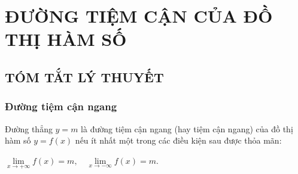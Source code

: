 \section[TIỆM CẬN]{ĐƯỜNG TIỆM CẬN CỦA ĐỒ THỊ HÀM SỐ}
\subsection{TÓM TẮT LÝ THUYẾT}
\subsubsection{Đường tiệm cận ngang}%
\begin{dn}
    Đường thẳng $y=m$ là đường tiệm cận ngang (hay tiệm cận ngang)
    của đồ thị hàm số $y=f(x)$ nếu ít nhất một trong các điều kiện sau được thỏa mãn:\\
    \centerline{$\lim\limits_{x\to+\infty}f(x)=m, \quad\lim\limits_{x\to-\infty}f(x)=m $.}
\end{dn}
